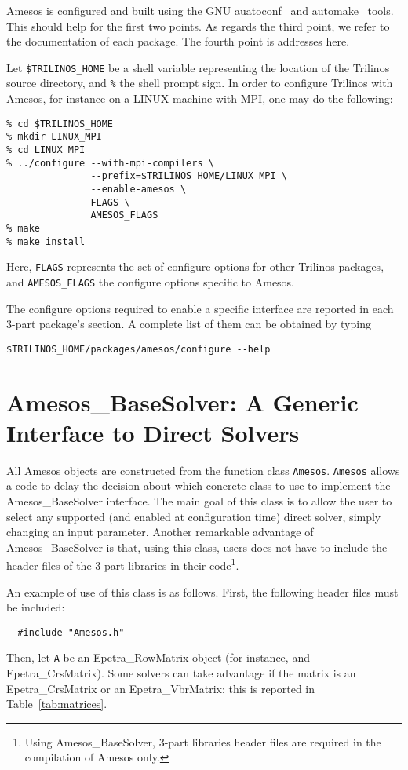 \documentclass[11pt]{SANDreport}
\begin{document}
Amesos is configured and built using the GNU auatoconf~\cite{Autoconf}
and automake~\cite{Automake} tools. This should help for the first two
points. As regards the third point, we refer to the documentation of
each package. The fourth point is addresses here.

Let \verb!$TRILINOS_HOME! be a shell variable representing the location
of the Trilinos source directory, and \verb!%! the shell prompt sign.  In order to configure Trilinos with
Amesos, for instance on a LINUX machine with MPI, one may do the
following:
\begin{verbatim}
% cd $TRILINOS_HOME
% mkdir LINUX_MPI
% cd LINUX_MPI
% ../configure --with-mpi-compilers \
               --prefix=$TRILINOS_HOME/LINUX_MPI \
               --enable-amesos \
               FLAGS \
               AMESOS_FLAGS
% make
% make install
\end{verbatim}
Here, \verb!FLAGS! represents the set of configure options for other
Trilinos packages, and \verb!AMESOS_FLAGS! the configure options
specific to Amesos. 

The configure options required to enable a specific interface are
reported in each 3-part package's section. A complete list of them can
be obtained by typing
\begin{verbatim}
$TRILINOS_HOME/packages/amesos/configure --help
\end{verbatim}


\section{Amesos\_BaseSolver: A Generic Interface to Direct Solvers}
\label{sec:amesos_generic}

All Amesos objects are constructed from the function class
\verb!Amesos!.  \verb!Amesos! allows a code to delay the decision about
which concrete class to use to implement the Amesos\_BaseSolver
interface. The main goal of this class is to allow the user to select
any supported (and enabled at configuration time) direct solver, simply
changing an input parameter. Another remarkable advantage of
Amesos\_BaseSolver is that, using this class, users does not have to
include the header files of the 3-part libraries in their
code\footnote{Using Amesos\_BaseSolver, 3-part libraries header files
  are required in the compilation of Amesos only.}.

An example of use of this class is as follows. First, the following
header files must be included:
\begin{verbatim}
  #include "Amesos.h" 
\end{verbatim}
Then, let \verb!A! be an Epetra\_RowMatrix object (for instance, and
Epetra\_CrsMatrix). Some solvers can take advantage if the matrix is an
Epetra\_CrsMatrix or an Epetra\_VbrMatrix; this is reported in Table~\ref{tab:matrices}.
\end{document}
